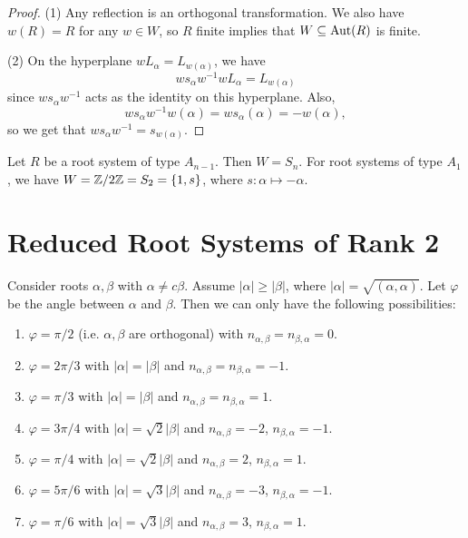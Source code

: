 \begin{proof}
  (1) Any reflection is an orthogonal
  transformation. We also have
  $w(R) = R$ for any $w \in W$, so
  $R$ finite implies that
  $W \subseteq \operatorname{Aut}(R)$ is finite.

  (2) On the hyperplane
  $w L_\alpha = L_{w(\alpha)}$, we have
  \[
    w s_\alpha w^{-1} w L_\alpha
    = L_{w(\alpha)}
  \]
  since $w s_\alpha w^{-1}$ acts as the
  identity on this hyperplane. Also,
  \[
    w s_\alpha w^{-1} w(\alpha)
    = w s_\alpha(\alpha)
    = -w(\alpha),
  \]
  so we get that
  $w s_\alpha w^{-1} = s_{w(\alpha)}$.
\end{proof}

\begin{example}
  Let $R$ be a root system of
  type $A_{n - 1}$. Then
  $W = S_n$. For
  root systems of type $A_1$, we have
  $W = \mathbb{Z} / 2\mathbb{Z} = S_2 = \{1, s\}$,
  where $s : \alpha \mapsto -\alpha$.
\end{example}

\section{Reduced Root Systems of Rank 2}

\begin{prop}
  Consider roots $\alpha, \beta$ with
  $\alpha \ne c \beta$. Assume
  $|\alpha| \ge |\beta|$, where
  $|\alpha| = \sqrt{(\alpha, \alpha)}$.
  Let $\varphi$ be the angle between
  $\alpha$ and $\beta$. Then we
  can only have the following possibilities:
  \begin{enumerate}
    \item $\varphi = \pi / 2$ (i.e.
      $\alpha, \beta$ are orthogonal)
      with $n_{\alpha, \beta} = n_{\beta, \alpha} = 0$.
    \item[2a.] $\varphi = 2\pi / 3$ with
      $|\alpha| = |\beta|$
      and $n_{\alpha, \beta} = n_{\beta, \alpha} = -1$.
    \item[2b.] $\varphi = \pi / 3$ with
      $|\alpha| = |\beta|$
      and $n_{\alpha, \beta} = n_{\beta, \alpha} = 1$.
    \item[3a.] $\varphi = 3\pi / 4$ with
      $|\alpha| = \sqrt{2} |\beta|$
      and $n_{\alpha, \beta} = -2$,
      $n_{\beta, \alpha} = -1$.
    \item[3b.] $\varphi = \pi / 4$ with
      $|\alpha| = \sqrt{2} |\beta|$
      and $n_{\alpha, \beta} = 2$,
      $n_{\beta, \alpha} = 1$.
    \item [4a.]
      $\varphi = 5\pi / 6$ with
      $|\alpha| = \sqrt{3} |\beta|$
      and $n_{\alpha, \beta} = -3$,
      $n_{\beta, \alpha} = -1$.
    \item[4b.] $\varphi = \pi / 6$ with
      $|\alpha| = \sqrt{3} |\beta|$
      and $n_{\alpha, \beta} = 3$,
      $n_{\beta, \alpha} = 1$.
  \end{enumerate}
\end{prop}

